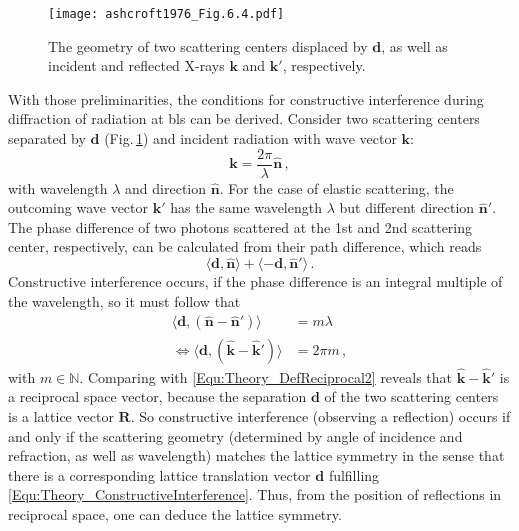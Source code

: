 \begin{figure}
    \centering
    \texttt{[image: ashcroft1976\_Fig.6.4.pdf]}
    \caption{The geometry of two scattering centers displaced by $\mathbf{d}$, as well as incident and reflected X-rays $\mathbf{k}$ and $\mathbf{k}'$, respectively.}
    \label{Fig:Theory_XRD_ashcroft1976}
\end{figure}
With those preliminarities, the conditions for constructive interference during dif\-frac\-tion of radiation at \glspl{bl} can be derived.
Consider two scattering centers separated by $\mathbf{d}$ (Fig.\,\ref{Fig:Theory_XRD_ashcroft1976}) and incident radiation with wave vector $\mathbf{k}$:
\begin{equation}
        \mathbf{k}=\frac{2\pi}{\lambda}\hat{\mathbf{n}}\,,
\end{equation}
with wavelength $\lambda$ and direction $\hat{\mathbf{n}}$.
For the case of elastic scattering, the outcoming wave vector $\mathbf{k}'$ has the same wavelength $\lambda$ but different direction $\hat{\mathbf{n}}'$.
The phase difference of two photons scattered at the 1st and 2nd scattering center, respectively, can be calculated from their path difference, which reads
\begin{equation}\label{Equ:Theory_PathDifference}
    \langle\mathbf{d},\hat{\mathbf{n}}\rangle+\langle-\mathbf{d},\hat{\mathbf{n}}'\rangle\,.
\end{equation}
Constructive interference occurs, if the phase difference is an integral multiple of the wavelength, so it must follow that
\begin{align}
    \langle\mathbf{d},(\hat{\mathbf{n}}-\hat{\mathbf{n}}')\rangle&=m\lambda\\
    \Leftrightarrow\langle\mathbf{d},(\hat{\mathbf{k}}-\hat{\mathbf{k}}')\rangle&=2\pi m\,,
    \label{Equ:Theory_ConstructiveInterference}
\end{align}
with $m\in\mathbb{N}$.
Comparing with \eqref{Equ:Theory_DefReciprocal2} reveals that $\hat{\mathbf{k}}-\hat{\mathbf{k}}'$ is a reciprocal space vector, because the separation $\mathbf{d}$ of the two scattering centers is a lattice vector $\mathbf{R}$.
So constructive interference (observing a reflection) occurs if and only if the scattering geometry (determined by angle of incidence and refraction, as well as wavelength) matches the lattice symmetry in the sense that there is a corresponding lattice translation vector $\mathbf{d}$ fulfilling \eqref{Equ:Theory_ConstructiveInterference}.
Thus, from the position of reflections in reciprocal space, one can deduce the lattice symmetry.

